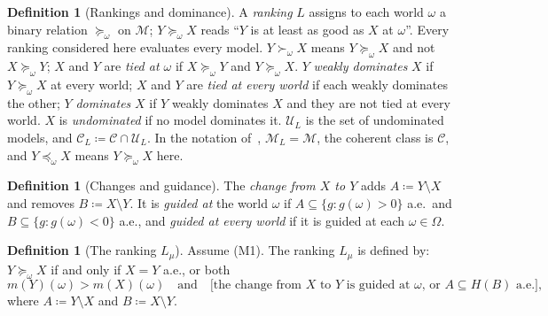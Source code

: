 \documentclass[11pt]{article}
\theoremstyle{definition}
\newtheorem{definition}[theorem]{Definition}
\newcommand{\M}{\mathcal M}
\newcommand{\C}{\mathcal C}
\newcommand{\U}{\mathcal U}
\newcommand{\Lmu}{L_\mu}
\begin{document}
\begin{definition}[Rankings and dominance]\label{def:rankings}
A \emph{ranking} $L$ assigns to each world $\omega$ a binary relation $\succeq_\omega$ on $\M$; $Y\succeq_\omega X$ reads ``$Y$ is at least as good as $X$ at $\omega$''. Every ranking considered here evaluates every model. $Y\succ_\omega X$ means $Y\succeq_\omega X$ and not $X\succeq_\omega Y$; $X$ and $Y$ are \emph{tied at $\omega$} if $X\succeq_\omega Y$ and $Y\succeq_\omega X$. $Y$ \emph{weakly dominates} $X$ if $Y\succeq_\omega X$ at every world; $X$ and $Y$ are \emph{tied at every world} if each weakly dominates the other; $Y$ \emph{dominates} $X$ if $Y$ weakly dominates $X$ and they are not tied at every world. $X$ is \emph{undominated} if no model dominates it. $\U_L$ is the set of undominated models, and $\C_L\coloneqq\C\cap\U_L$. In the notation of~\cite{LDG}, $\M_L=\M$, the coherent class is $\C$, and $Y\preceq_\omega X$ means $Y\succeq_\omega X$ here.
\end{definition}

\begin{definition}[Changes and guidance]\label{def:change}
The \emph{change from $X$ to $Y$} adds $A\coloneqq Y\setminus X$ and removes $B\coloneqq X\setminus Y$. It is \emph{guided at} the world $\omega$ if $A\subseteq\{g:g(\omega)>0\}$ a.e.\ and $B\subseteq\{g:g(\omega)<0\}$ a.e., and \emph{guided at every world} if it is guided at each $\omega\in\Omega$.
\end{definition}

\begin{definition}[The ranking $\Lmu$]\label{def:ranking}
Assume (M1). The ranking $\Lmu$ is defined by: $Y\succeq_\omega X$ if and only if $X=Y$ a.e., or both
\[
m(Y)(\omega)>m(X)(\omega)\quad\text{and}\quad\bigl[\text{the change from $X$ to $Y$ is guided at $\omega$, or }A\subseteq H(B)\text{ a.e.}\bigr],
\]
where $A\coloneqq Y\setminus X$ and $B\coloneqq X\setminus Y$.
\end{definition}
\end{document}
